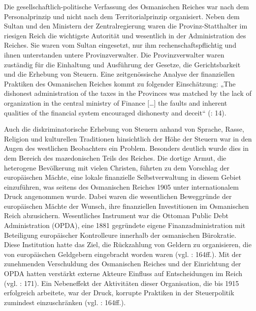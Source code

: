 Die gesellschaftlich-politische Verfassung des Osmanischen Reiches war nach dem Personalprinzip und nicht nach dem Territorialprinzip organisiert. Neben dem Sultan und den Ministern der Zentralregierung waren die Provinz-Statthalter im riesigen Reich die wichtigste Autorität und wesentlich in der Administration des Reiches. Sie waren vom Sultan eingesetzt, nur ihm rechenschaftspflichtig und ihnen unterstanden untere Provinzverwalter. Die Provinzverwalter waren zuständig für die Einhaltung und Ausführung der Gesetze, die Gerichtsbarkeit und die Erhebung von Steuern. Eine zeitgenössische Analyse der finanziellen Praktiken des Osmanischen Reiches kommt zu folgender Einschätzung: „The dishonest administration of the taxes in the Provinces was matched by the lack of organization in the central ministry of Finance […] the faults and inherent qualities of the financial system encouraged dishonesty and deceit“ (\cite{blaisd}: 14).\par
Auch die diskriminatorische Erhebung von Steuern anhand von Sprache, Rasse, Religion und kulturellen Traditionen hinsichtlich der Höhe der Steuern war in den Augen des westlichen Beobachters ein Problem. Besonders deutlich wurde dies in dem Bereich des mazedonischen Teils des Reiches. Die dortige Armut, die heterogene Bevölkerung mit vielen Christen, führten zu dem Vorschlag der europäischen Mächte, eine lokale finanzielle Selbstverwaltung in diesem Gebiet einzuführen, was seitens des Osmanischen Reiches 1905 unter internationalem Druck angenommen wurde. Dabei waren die wesentlichen Beweggründe der europäischen Mächte der Wunsch, ihre finanziellen Investitionen im Osmanischen Reich abzusichern. Wesentliches Instrument war die Ottoman Public Debt Administration (OPDA), eine 1881 gegründete eigene Finanzadministration mit Beteiligung europäischer Kontrolleure innerhalb der osmanischen Bürokratie. Diese Institution hatte das Ziel, die Rückzahlung von Geldern zu organisieren, die von europäischen Geldgebern eingebracht worden waren (vgl. \cite{blaisd}: 164ff.). Mit der zunehmenden Verschuldung des Osmanischen Reiches und der Einrichtung der OPDA hatten verstärkt externe Akteure Einfluss auf Entscheidungen im Reich (vgl. \cite{toepfer}: 171). Ein Nebeneffekt der Aktivitäten dieser Organisation, die bis 1915 erfolgreich arbeitete, war der Druck, korrupte Praktiken in der Steuerpolitik zumindest einzuschränken (vgl. \cite{blaisd}: 164ff.).\par

